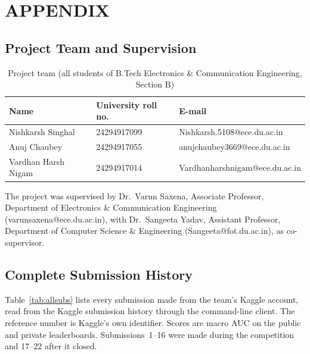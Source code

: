 \cleardoublepage
{}
{}
\chapter*{APPENDIX}
\setcounter{section}{0}
\renewcommand{\thesection}{\Alph{section}}
\renewcommand{\theHsection}{app.\Alph{section}}
\renewcommand{\theHtable}{app.\Alph{section}.\arabic{table}}
\renewcommand{\thefigure}{\Alph{section}.\arabic{figure}}
\renewcommand{\theHfigure}{app.\Alph{section}.\arabic{figure}}
\setcounter{figure}{0}
\renewcommand{\thetable}{\Alph{section}.\arabic{table}}
\setcounter{table}{0}

\section{Project Team and Supervision}

\begin{table}[H]
\centering\footnotesize{}
\caption{Project team (all students of B.Tech Electronics \& Communication Engineering, Section B)}
\label{tab:team}
\begin{tabular}{L{4.2cm}L{3.0cm}L{6.2cm}}
\toprule
Name & University roll no. & E-mail \\
\midrule
Nishkarsh Singhal & 24294917099 & Nishkarsh.5108@ece.du.ac.in \\
Anuj Chaubey & 24294917055 & anujchaubey3669@ece.du.ac.in \\
Vardhan Harsh Nigam & 24294917014 & Vardhanharshnigam@ece.du.ac.in \\
\bottomrule
\end{tabular}
\end{table}

The project was supervised by Dr.\ Varun Saxena, Associate Professor, Department of Electronics \& Communication Engineering (varunsaxena@ece.du.ac.in), with Dr.\ Sangeeta Yadav, Assistant Professor, Department of Computer Science \& Engineering (Sangeeta@fot.du.ac.in), as co-supervisor.

\section{Complete Submission History}

Table~\ref{tab:allsubs} lists every submission made from the team's Kaggle account, read from the Kaggle submission history through the command-line client. The reference number is Kaggle's own identifier. Scores are macro AUC on the public and private leaderboards. Submissions~1--16 were made during the competition and 17--22 after it closed.

